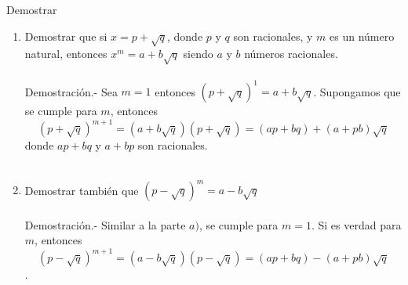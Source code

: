 \begin{teo} Demostrar
\begin{enumerate}[\bfseries a)]
\item Demostrar que si $x=p+ \sqrt{q}$, donde $p$ \; y \; $q$ son racionales, y \; $m$ es un número natural, entonces $x^m = a + b \sqrt{q}$ siendo $a$ \; y \; $b$ números racionales.\\\\
Demostración.- \; Sea $m=1$ entonces $(p + \sqrt{q})^1 = a + b\sqrt{q}$. Supongamos que se cumple para $m$, entonces $$(p+\sqrt{q})^{m+1} = (a + b\sqrt{q})(p + \sqrt{q}) = (ap+bq)+(a+pb)\sqrt{q}$$ donde $ap+bq$ y $a+bp$ son racionales.\\\\

\item Demostrar también que $(p - \sqrt{q})^m = a - b\sqrt{q}$\\\\
Demostración.- \; Similar a la parte $a)$, se cumple para $m=1$. Si es verdad para $m$, entonces $$(p-\sqrt{q})^{m+1} = (a - b\sqrt{q})(p - \sqrt{q}) = (ap+bq)-(a+pb)\sqrt{q}$$.\\\\
\end{enumerate}
\end{teo}

